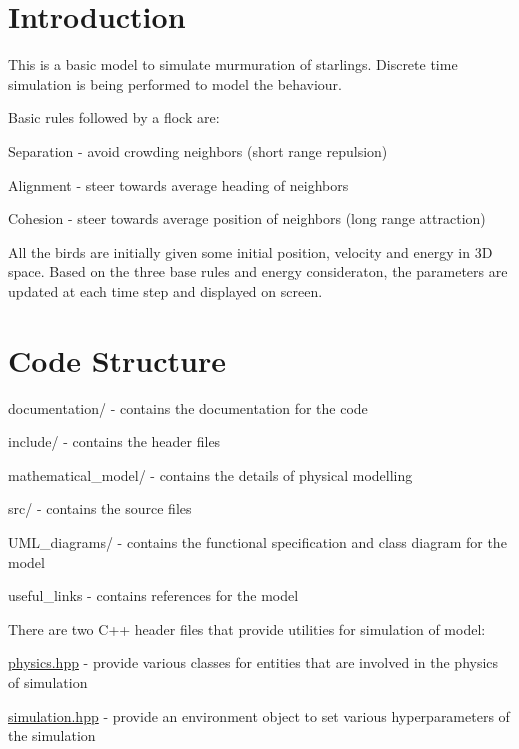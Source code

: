 \hypertarget{index_intro_sec}{}\section{Introduction}\label{index_intro_sec}
This is a basic model to simulate murmuration of starlings. Discrete time simulation is being performed to model the behaviour.

Basic rules followed by a flock are\+:
\begin{DoxyItemize}
\item Separation -\/ avoid crowding neighbors (short range repulsion)
\item Alignment -\/ steer towards average heading of neighbors
\item Cohesion -\/ steer towards average position of neighbors (long range attraction)
\end{DoxyItemize}

All the birds are initially given some initial position, velocity and energy in 3D space. Based on the three base rules and energy consideraton, the parameters are updated at each time step and displayed on screen.\hypertarget{index_code_sec}{}\section{Code Structure}\label{index_code_sec}
documentation/ -\/ contains the documentation for the code

include/ -\/ contains the header files

mathematical\+\_\+model/ -\/ contains the details of physical modelling

src/ -\/ contains the source files

U\+M\+L\+\_\+diagrams/ -\/ contains the functional specification and class diagram for the model

useful\+\_\+links -\/ contains references for the model

There are two C++ header files that provide utilities for simulation of model\+:
\begin{DoxyItemize}
\item \mbox{\hyperlink{physics_8hpp}{physics.\+hpp}} -\/ provide various classes for entities that are involved in the physics of simulation
\item \mbox{\hyperlink{simulation_8hpp}{simulation.\+hpp}} -\/ provide an environment object to set various hyperparameters of the simulation 
\end{DoxyItemize}
